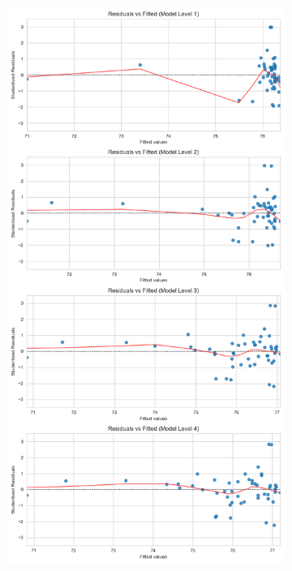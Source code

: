 \documentclass[11pt, oneside]{article}   	%
\begin{document}
\begin{figure}[H]
\centering
\begin{subfigure}{.5\textwidth}
  \centering
  \includegraphics[width=\linewidth]{../plots/fnn_data/hierarchy1/studentized_residuals_vs_fitted}

\end{subfigure}
\end{figure}
\end{document}
